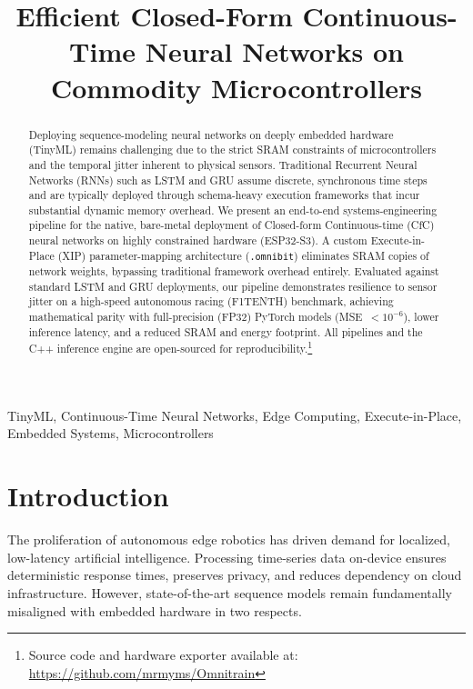 \documentclass[conference]{IEEEtran}
\begin{document}
\title{Efficient Closed-Form Continuous-Time Neural Networks on Commodity Microcontrollers}

\author{
}

\maketitle

\begin{abstract}
Deploying sequence-modeling neural networks on deeply embedded hardware (TinyML) remains challenging due to the strict SRAM constraints of microcontrollers and the temporal jitter inherent to physical sensors. Traditional Recurrent Neural Networks (RNNs) such as LSTM and GRU assume discrete, synchronous time steps and are typically deployed through schema-heavy execution frameworks that incur substantial dynamic memory overhead. We present an end-to-end systems-engineering pipeline for the native, bare-metal deployment of Closed-form Continuous-time (CfC) neural networks on highly constrained hardware (ESP32-S3). A custom Execute-in-Place (XIP) parameter-mapping architecture (\texttt{.omnibit}) eliminates SRAM copies of network weights, bypassing traditional framework overhead entirely. Evaluated against standard LSTM and GRU deployments, our pipeline demonstrates resilience to sensor jitter on a high-speed autonomous racing (F1TENTH) benchmark, achieving mathematical parity with full-precision (FP32) PyTorch models (MSE~$<10^{-6}$), lower inference latency, and a reduced SRAM and energy footprint. All pipelines and the C++ inference engine are open-sourced for reproducibility.\footnote{Source code and hardware exporter available at: \url{https://github.com/mrmyms/Omnitrain}}
\end{abstract}

\begin{IEEEkeywords}
TinyML, Continuous-Time Neural Networks, Edge Computing, Execute-in-Place, Embedded Systems, Microcontrollers
\end{IEEEkeywords}

\section{Introduction}
The proliferation of autonomous edge robotics has driven demand for localized, low-latency artificial intelligence. Processing time-series data on-device ensures deterministic response times, preserves privacy, and reduces dependency on cloud infrastructure. However, state-of-the-art sequence models remain fundamentally misaligned with embedded hardware in two respects.
\end{document}
